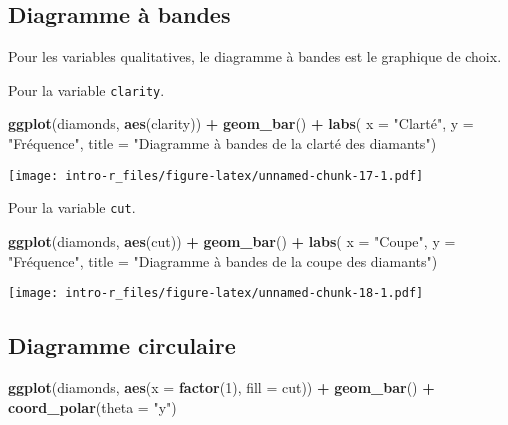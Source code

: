 \documentclass[]{book}
\newenvironment{Shaded}{\begin{snugshade}}{\end{snugshade}}
\newcommand{\KeywordTok}[1]{\textcolor[rgb]{0.13,0.29,0.53}{\textbf{#1}}}
\newcommand{\DataTypeTok}[1]{\textcolor[rgb]{0.13,0.29,0.53}{#1}}
\newcommand{\DecValTok}[1]{\textcolor[rgb]{0.00,0.00,0.81}{#1}}
\newcommand{\StringTok}[1]{\textcolor[rgb]{0.31,0.60,0.02}{#1}}
\newcommand{\OperatorTok}[1]{\textcolor[rgb]{0.81,0.36,0.00}{\textbf{#1}}}
\newcommand{\NormalTok}[1]{#1}
\begin{document}
\subsection{Diagramme à bandes}\label{diagramme-a-bandes}

Pour les variables qualitatives, le diagramme à bandes est le graphique
de choix.

Pour la variable \texttt{clarity}.

\begin{Shaded}
\begin{Highlighting}[]
\KeywordTok{ggplot}\NormalTok{(diamonds, }\KeywordTok{aes}\NormalTok{(clarity)) }\OperatorTok{+}\StringTok{ }\KeywordTok{geom_bar}\NormalTok{() }\OperatorTok{+}
\StringTok{  }\KeywordTok{labs}\NormalTok{(}
    \DataTypeTok{x =} \StringTok{"Clarté"}\NormalTok{, }
    \DataTypeTok{y =} \StringTok{"Fréquence"}\NormalTok{, }
    \DataTypeTok{title =} \StringTok{"Diagramme à bandes de la clarté des diamants"}\NormalTok{)}
\end{Highlighting}
\end{Shaded}

\texttt{[image: intro-r\_files/figure-latex/unnamed-chunk-17-1.pdf]}

Pour la variable \texttt{cut}.

\begin{Shaded}
\begin{Highlighting}[]
\KeywordTok{ggplot}\NormalTok{(diamonds, }\KeywordTok{aes}\NormalTok{(cut)) }\OperatorTok{+}\StringTok{ }\KeywordTok{geom_bar}\NormalTok{() }\OperatorTok{+}
\StringTok{  }\KeywordTok{labs}\NormalTok{(}
    \DataTypeTok{x =} \StringTok{"Coupe"}\NormalTok{, }
    \DataTypeTok{y =} \StringTok{"Fréquence"}\NormalTok{, }
    \DataTypeTok{title =} \StringTok{"Diagramme à bandes de la coupe des diamants"}\NormalTok{)}
\end{Highlighting}
\end{Shaded}

\texttt{[image: intro-r\_files/figure-latex/unnamed-chunk-18-1.pdf]}

\subsection{Diagramme circulaire}\label{diagramme-circulaire}

\begin{Shaded}
\begin{Highlighting}[]
\KeywordTok{ggplot}\NormalTok{(diamonds, }\KeywordTok{aes}\NormalTok{(}\DataTypeTok{x =} \KeywordTok{factor}\NormalTok{(}\DecValTok{1}\NormalTok{), }\DataTypeTok{fill =}\NormalTok{ cut)) }\OperatorTok{+}\StringTok{ }
\StringTok{  }\KeywordTok{geom_bar}\NormalTok{() }\OperatorTok{+}
\StringTok{  }\KeywordTok{coord_polar}\NormalTok{(}\DataTypeTok{theta =} \StringTok{"y"}\NormalTok{)}
\end{Highlighting}
\end{Shaded}
\end{document}
